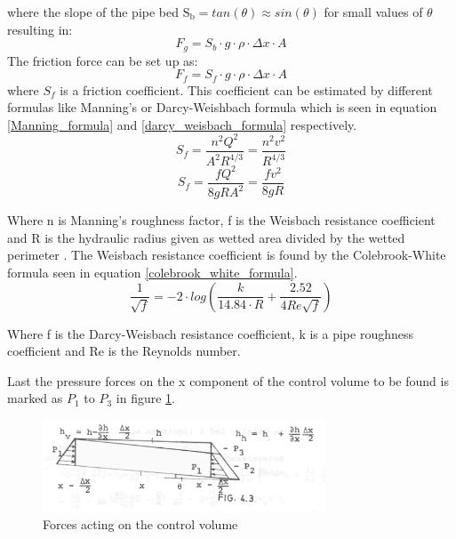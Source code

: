 where the slope of the pipe bed $\text{S}_\text{b} = tan(\theta) \approx sin(\theta)$ for small values of $\theta$ resulting in:
\begin{equation}
F_g = S_b \cdot g \cdot \rho \cdot \Delta x \cdot A 
\end{equation}
The friction force can be set up as:
\begin{equation}
F_f = S_f \cdot g \cdot \rho \cdot \Delta x \cdot A 
\label{friction_force} 
\end{equation}
where $S_f$ is a friction coefficient. This coefficient can be estimated by different formulas like Manning's or Darcy-Weishbach formula which is seen in equation \ref{Manning_formula} and \ref{darcy_weisbach_formula} respectively. 
\begin{equation}
	S_f = \frac{n^2 Q^2}{A^2R^{4/3}}= \frac{n^2 v^2}{R^{4/3}}
\label{Manning_formula}
\end{equation}
\begin{equation}
	S_f = \frac{f Q^2}{8gR A^2}= \frac{f v^2}{8gR}
\label{darcy_weisbach_formula}
\end{equation}

Where n is Manning's roughness factor, f is the Weisbach resistance coefficient and R is the hydraulic radius given as wetted area divided by the wetted perimeter \cite{stormwatercollectionsystems}.
The Weisbach resistance coefficient is found by the Colebrook-White formula seen in equation \ref{colebrook_white_formula}.
\begin{equation}
\frac{1}{\sqrt{f}} = -2\cdot log \left( \frac{k}{14.84 \cdot R}+ \frac{2.52}{4 Re \sqrt{f}} \right)
\label{colebrook_white_formula}
\end{equation}

Where f is the Darcy-Weisbach resistance coefficient, k is a pipe roughness coefficient and Re is the Reynolds number.

Last the pressure forces on the x component of the control volume to be found is marked as $P_1$ to $P_3$ in figure \ref{fig:forces_on_CV}. 

\begin{figure}[H]
\centering
\includegraphics[width=0.75\textwidth]{report/modeling/pictures/palle_fig.png}
\caption{Forces acting on the control volume }
\label{fig:forces_on_CV}
\end{figure}

